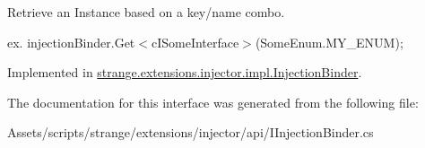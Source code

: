 Retrieve an Instance based on a key/name combo. 

ex. {\ttfamily injection\-Binder.\-Get$<$c\-I\-Some\-Interface$>$(Some\-Enum.\-M\-Y\-\_\-\-E\-N\-U\-M);} 

Implemented in \hyperlink{classstrange_1_1extensions_1_1injector_1_1impl_1_1_injection_binder_a1cd9b99f05837f13f0dbc2e47e603faa}{strange.\-extensions.\-injector.\-impl.\-Injection\-Binder}.



The documentation for this interface was generated from the following file\-:\begin{DoxyCompactItemize}
\item 
Assets/scripts/strange/extensions/injector/api/I\-Injection\-Binder.\-cs\end{DoxyCompactItemize}
